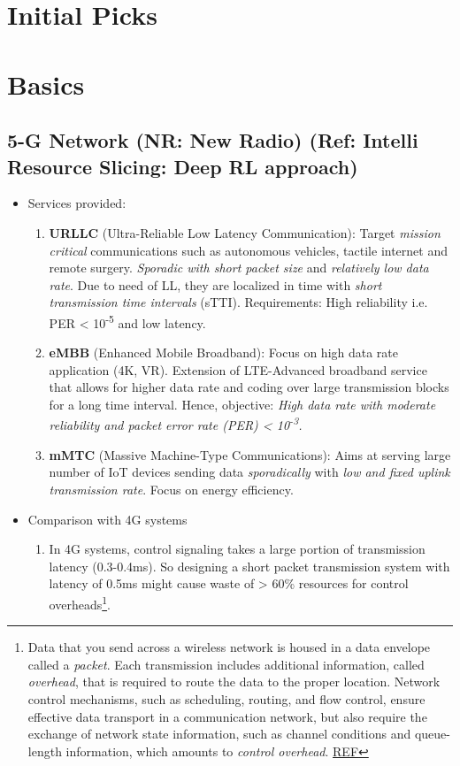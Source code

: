 \documentclass[11pt]{article}
\begin{document}
\section{Initial Picks}
\label{sec:org8b2bb13}
\section{Basics}
\label{sec:org50ebe08}
\subsection{5-G Network (NR: New Radio) (Ref: Intelli Resource Slicing: Deep RL approach)}
\label{sec:orgc5d7bae}
\begin{itemize}
\item Services provided:
\begin{enumerate}
\item \textbf{URLLC} (Ultra-Reliable Low Latency Communication): Target \emph{mission critical} communications such as autonomous vehicles, tactile internet and remote surgery. \emph{Sporadic with short packet size} and \emph{relatively low data rate}. Due to need of LL, they are localized in time with \emph{short transmission time intervals} (sTTI). Requirements: High reliability i.e. PER < 10\textsuperscript{-5} and low latency.
\item \textbf{eMBB} (Enhanced Mobile Broadband): Focus on high data rate application (4K, VR). Extension of LTE-Advanced broadband service that allows for higher data rate and coding over large transmission blocks for a long time interval. Hence, objective: \emph{High data rate with moderate reliability and packet error rate (PER) < 10\textsuperscript{-3}.}
\item \textbf{mMTC} (Massive Machine-Type Communications): Aims at serving large number of IoT devices sending data \emph{sporadically} with \emph{low and fixed uplink transmission rate}. Focus on energy efficiency.
\end{enumerate}
\item Comparison with 4G systems
\begin{enumerate}
\item In 4G systems, control signaling takes a large portion of transmission latency (0.3-0.4ms). So designing a short packet transmission system with latency of 0.5ms might cause waste of > 60\% resources for control overheads\footnote{Data that you send across a wireless network is housed in a data envelope called a \emph{packet}. Each transmission includes additional information, called \emph{overhead}, that is required to route the data to the proper location. Network control mechanisms, such as scheduling, routing, and flow control, ensure effective data transport in a communication network, but also require the exchange of network state information, such as channel conditions and queue-length information, which amounts to \emph{control overhead}. \href{http://cnrg.mit.edu/protocol-information}{REF}}.

\end{enumerate}
\end{itemize}
\end{document}
